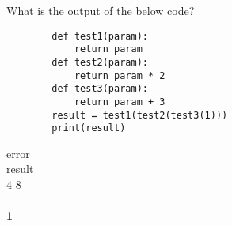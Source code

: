 \documentclass{exam}
\begin{document}
\begin{questions}
    \question What is the output of the below code?

    \begin{verbatim}
        def test1(param):
            return param
        def test2(param): 
            return param * 2
        def test3(param):
            return param + 3
        result = test1(test2(test3(1)))
        print(result)
    \end{verbatim}

    \begin{oneparchoices}
        \choice error \\
        \choice result \\
         4 8 \\
         \\
        \choice \textbf{1}
    \end{oneparchoices}


\end{questions}
\end{document}
